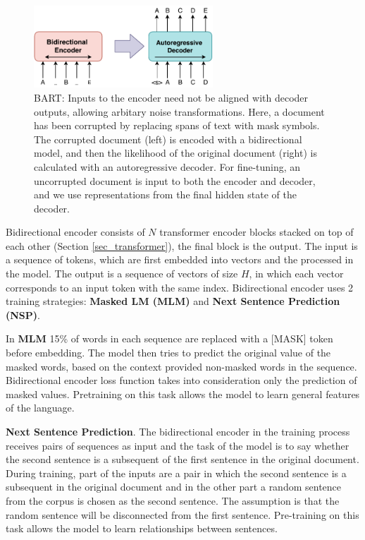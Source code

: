 \begin{figure}[hbt]
  \centering
  \includegraphics[width=0.6\textwidth]{figures/BART.pdf}
  \caption{BART: Inputs to the encoder need not be aligned with decoder outputs, allowing arbitary noise transformations. Here, a document has been corrupted by replacing spans of text with mask symbols. The corrupted document (left) is encoded with a bidirectional model, and then the likelihood of the original document (right) is calculated with an autoregressive decoder. For fine-tuning, an uncorrupted document is input to both the encoder and decoder, and we use representations from the final hidden state of the decoder\cite{lewis2019bart}.}
  \label{bart}
\end{figure}

Bidirectional encoder consists of $N$ transformer encoder blocks stacked on top of each other (Section \ref{sec_transformer}), the final block is the output. The input is a sequence of tokens, which are first embedded into vectors and the processed in the model. The output is a sequence of vectors of size $H$, in which each vector corresponds to an input token with the same index. Bidirectional encoder uses 2 training strategies: \textbf{Masked LM (MLM)} and \textbf{Next Sentence Prediction (NSP)}. 

In \textbf{MLM} 15\% of words in each sequence are replaced with a [MASK] token before embedding. The model then tries to predict the original value of the masked words, based on the context provided non-masked words in the sequence. Bidirectional encoder loss function takes into consideration only the prediction of masked values. Pretraining on this task allows the model to learn general features of the language.

\textbf{Next Sentence Prediction}. The bidirectional encoder in the training process receives pairs of sequences as input and the task of the model is to say whether the second sentence is a subsequent of the first sentence in the original document. During training, part of the inputs are a pair in which the second sentence is a subsequent in the original document and in the other part a random sentence from the corpus is chosen as the second sentence. The assumption is that the random sentence will be disconnected from the first sentence. Pre-training on this task allows the model to learn relationships between sentences.

